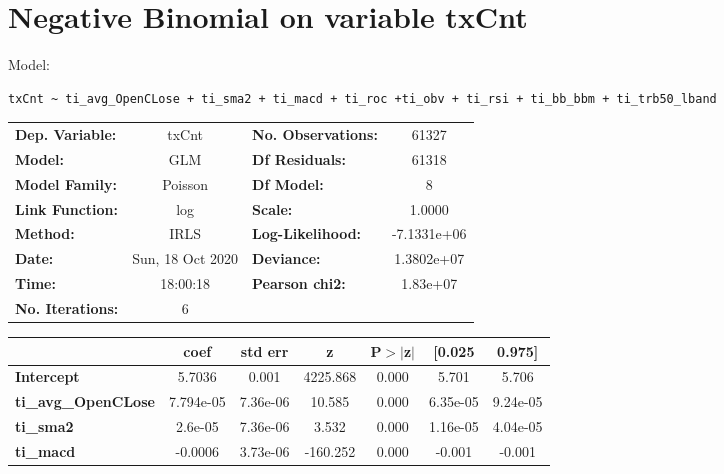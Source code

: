 \section{Negative Binomial on variable txCnt}

Model: \begin{verbatim}txCnt ~ ti_avg_OpenCLose + ti_sma2 + ti_macd + ti_roc +ti_obv + ti_rsi + ti_bb_bbm + ti_trb50_lband\end{verbatim}

\begin{center}
\begin{tabular}{lclc}
\toprule
\textbf{Dep. Variable:}     &      txCnt       & \textbf{  No. Observations:  } &     61327    \\
\textbf{Model:}             &       GLM        & \textbf{  Df Residuals:      } &     61318    \\
\textbf{Model Family:}      &     Poisson      & \textbf{  Df Model:          } &         8    \\
\textbf{Link Function:}     &       log        & \textbf{  Scale:             } &     1.0000   \\
\textbf{Method:}            &       IRLS       & \textbf{  Log-Likelihood:    } & -7.1331e+06  \\
\textbf{Date:}              & Sun, 18 Oct 2020 & \textbf{  Deviance:          } &  1.3802e+07  \\
\textbf{Time:}              &     18:00:18     & \textbf{  Pearson chi2:      } &   1.83e+07   \\
\textbf{No. Iterations:}    &        6         & \textbf{                     } &              \\
\bottomrule
\end{tabular}
\begin{tabular}{lcccccc}
                            & \textbf{coef} & \textbf{std err} & \textbf{z} & \textbf{P$> |$z$|$} & \textbf{[0.025} & \textbf{0.975]}  \\
\midrule
\textbf{Intercept}          &       5.7036  &        0.001     &  4225.868  &         0.000        &        5.701    &        5.706     \\
\textbf{ti\_avg\_OpenCLose} &    7.794e-05  &     7.36e-06     &    10.585  &         0.000        &     6.35e-05    &     9.24e-05     \\
\textbf{ti\_sma2}           &      2.6e-05  &     7.36e-06     &     3.532  &         0.000        &     1.16e-05    &     4.04e-05     \\
\textbf{ti\_macd}           &      -0.0006  &     3.73e-06     &  -160.252  &         0.000        &       -0.001    &       -0.001     \\

\end{tabular}
\end{center}
